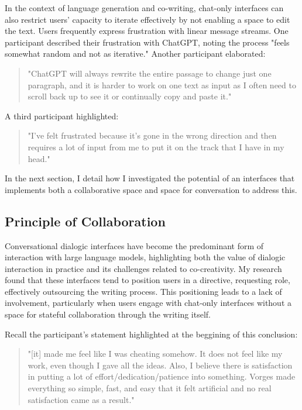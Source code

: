 In the context of language generation and co-writing, chat-only interfaces can also restrict users' capacity to iterate effectively by not enabling a space to edit the text. Users frequently express frustration with linear message streams. One participant described their frustration with ChatGPT, noting the process "feels somewhat random and not as iterative." Another participant elaborated:

\begin{quote}
"ChatGPT will always rewrite the entire passage to change just one paragraph, and it is harder to work on one text as input as I often need to scroll back up to see it or continually copy and paste it."
\end{quote}

A third participant highlighted:

\begin{quote}
"I've felt frustrated because it's gone in the wrong direction and then requires a lot of input from me to put it on the track that I have in my head."
\end{quote}


In the next section, I detail how I investigated the potential of an interfaces that implements both a collaborative space and space for conversation to address this. 

\subsection{Principle of Collaboration}

Conversational dialogic interfaces have become the predominant form of interaction with large language models, highlighting both the value of dialogic interaction in practice and its challenges related to co-creativity. My research found that these interfaces tend to position users in a directive, requesting role, effectively outsourcing the writing process. This positioning leads to a lack of involvement, particularly when users engage with chat-only interfaces without a space for stateful collaboration through the writing itself.

Recall the participant's statement highlighted at the beggining of this conclusion:

\begin{quote}
"[it] made me feel like I was cheating somehow. It does not feel like my work, even though I gave all the ideas. Also, I believe there is satisfaction in putting a lot of effort/dedication/patience into something. Vorges made everything so simple, fast, and easy that it felt artificial and no real satisfaction came as a result."
\end{quote}

